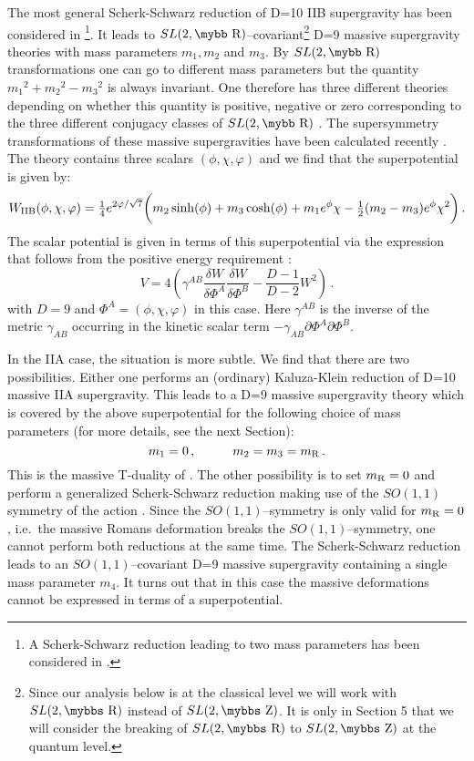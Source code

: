 \documentclass[12pt,a4paper]{article}
\def\bb#1{\hbox{\mybb#1}}
\def\bbs#1{\hbox{\mybbs#1}}
\begin{document}
The most general
Scherk-Schwarz reduction \cite{Scherk:1979ta} 
of D=10 IIB supergravity has been
considered in \cite{Meessen:1998qm}\footnote{A Scherk-Schwarz reduction
leading to
two mass parameters has been considered in \cite{Lavrinenko:1998qa}.}.
It leads to
$SL(2,\bb{R})$--covariant\footnote{Since our analysis below is at
the classical level we will work with $SL(2,{\bbs{R}})$ instead of
$SL(2,\bbs{Z})$. It is only in Section 5 that we will consider the
breaking of $SL(2,\bbs{R})$ to  $SL(2,\bbs{Z})$ at the quantum
level.} D=9 massive supergravity theories with mass parameters
$m_1, m_2$ and $m_3$.
By $SL(2,\bb{R})$ transformations one can go
to different mass parameters but the quantity $m_1{}^2+m_2{}^2-m_3{}^2$
is always invariant.
One therefore has three different theories depending on
whether this quantity is positive, negative or zero corresponding
to the three different conjugacy classes of $SL(2,\bb{R})$ \cite{Hull:1998vy}.
The supersymmetry
transformations of these massive supergravities have been
calculated recently \cite{Gheerardyn:2001jj}. The theory contains
three scalars $(\phi, \chi, \varphi)$ and we find that the
superpotential is given by:
%
\begin{equation}
  W_{\rm IIB}(\phi, \chi, \varphi) = {\tfrac{1}{4}} e^{2\varphi/\sqrt{7}}
  \biggl( m_2 \sinh(\phi) + m_3 \cosh(\phi) + m_1 e^\phi\chi
- {\textstyle{1\over 2}}(m_2-m_3)e^\phi \chi^2\biggr )\, .
\label{sp9}
\end{equation}
%
The scalar potential is given in terms of this superpotential
via the expression that follows from the positive energy requirement
\cite{Townsend:1984iu}:
\begin{equation}
  V =4 \left( \gamma^{AB}\frac{\delta W}{\delta\Phi^A}
  \frac{\delta W}{\delta \Phi^B}
  - \frac{D-1}{D-2} W^2 \right) \, .
\end{equation}
with $D=9$ and $\Phi^A=(\phi, \chi, \varphi)$ in this case.
Here $\gamma^{AB}$ is the inverse of the metric
$\gamma_{AB}$ occurring in the kinetic scalar term
$-\gamma_{AB}\partial\Phi^A\partial\Phi^B$.

In the IIA case, the situation is more subtle. We find that there are
two possibilities. Either one performs an (ordinary) Kaluza-Klein
reduction of D=10 massive IIA supergravity. This leads to a D=9
massive supergravity theory which is covered by the above superpotential
for the following choice of mass parameters (for more details, see
the next Section):
\begin{equation}
  m_1 = 0\, ,\hskip 1truecm m_2 = m_3 = m_{\rm R} \, .
\end{equation}
This is the massive T-duality of \cite{Bergshoeff:1996ui}.
The other possibility is to  set $m_{\rm R} = 0$ and perform a
generalized Scherk-Schwarz reduction making use of the $SO(1,1)$
symmetry of the action \cite{Lavrinenko:1998qa}. Since the
$SO(1,1)$--symmetry is only valid for $m_{\rm R} = 0$, i.e.~the
massive Romans deformation breaks the $SO(1,1)$--symmetry, one
cannot perform both reductions at the same time. The
Scherk-Schwarz reduction leads to an $SO(1,1)$--covariant
D=9 massive supergravity containing a single mass parameter $m_4$.
It turns out that in this case the massive deformations
cannot be expressed in terms of a  superpotential.
\end{document}
